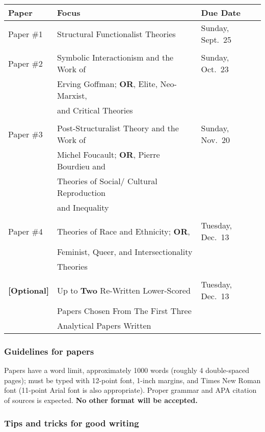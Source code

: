 \documentclass[11pt,]{article}
\begin{document}
\begin{longtable}[]{@{}lll@{}}
\toprule
\textbf{Paper} & \textbf{Focus} & \textbf{Due Date} \\
\midrule
\endhead
Paper \#1 & Structural Functionalist Theories & Sunday, Sept.~25 \\
& & \\
Paper \#2 & Symbolic Interactionism and the Work of & Sunday, Oct.~23 \\
& Erving Goffman; \textbf{OR}, Elite, Neo-Marxist, & \\
& and Critical Theories & \\
& & \\
Paper \#3 & Post-Structuralist Theory and the Work of & Sunday,
Nov.~20 \\
& Michel Foucault; \textbf{OR}, Pierre Bourdieu and & \\
& Theories of Social/ Cultural Reproduction & \\
& and Inequality & \\
& & \\
Paper \#4 & Theories of Race and Ethnicity; \textbf{OR}, & Tuesday,
Dec.~13 \\
& Feminist, Queer, and Intersectionality & \\
& Theories & \\
& & \\
\textbf{{[}Optional{]}} & Up to \textbf{Two} Re-Written Lower-Scored &
Tuesday, Dec.~13 \\
& Papers Chosen From The First Three & \\
& Analytical Papers Written & \\
\bottomrule
\end{longtable}

\hypertarget{guidelines-for-papers}{%
\subsubsection{Guidelines for papers}\label{guidelines-for-papers}}

Papers have a word limit, approximately 1000 words (roughly 4
double-spaced pages); must be typed with 12-point font, 1-inch margins,
and Times New Roman font (11-point Arial font is also appropriate).
Proper grammar and APA citation of sources is expected. \textbf{No other
format will be accepted.}

\hypertarget{tips-and-tricks-for-good-writing}{%
\subsubsection{Tips and tricks for good
writing}\label{tips-and-tricks-for-good-writing}}
\end{document}
